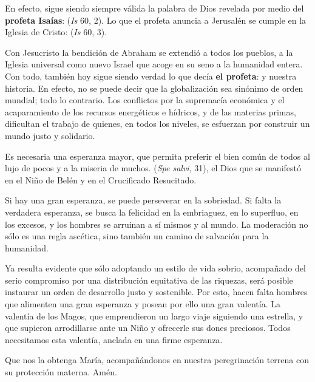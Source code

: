 {En efecto, sigue siendo siempre válida la palabra de Dios revelada por medio del \textbf{profeta Isaías}:  (\emph{Is} 60, 2). Lo que el profeta anuncia a Jerusalén se cumple en la Iglesia de Cristo:  (\emph{Is} 60, 3).

Con Jesucristo la bendición de Abraham se extendió a todos los pueblos, a la Iglesia universal como nuevo Israel que acoge en su seno a la humanidad entera. Con todo, también hoy sigue siendo verdad lo que decía \textbf{el profeta}:  y nuestra historia. En efecto, no se puede decir que la globalización sea sinónimo de orden mundial; todo lo contrario. Los conflictos por la supremacía económica y el acaparamiento de los recursos energéticos e hídricos, y de las materias primas, dificultan el trabajo de quienes, en todos los niveles, se esfuerzan por construir un mundo justo y solidario.

Es necesaria una esperanza mayor, que permita preferir el bien común de todos al lujo de pocos y a la miseria de muchos.  (\emph{Spe salvi}, 31), el Dios que se manifestó en el Niño de Belén y en el Crucificado Resucitado.

Si hay una gran esperanza, se puede perseverar en la sobriedad. Si falta la verdadera esperanza, se busca la felicidad en la embriaguez, en lo superfluo, en los excesos, y los hombres se arruinan a sí mismos y al mundo. La moderación no sólo es una regla ascética, sino también un camino de salvación para la humanidad.

Ya resulta evidente que sólo adoptando un estilo de vida sobrio, acompañado del serio compromiso por una distribución equitativa de las riquezas, será posible instaurar un orden de desarrollo justo y sostenible. Por esto, hacen falta hombres que alimenten una gran esperanza y posean por ello una gran valentía. La valentía de los Magos, que emprendieron un largo viaje siguiendo una estrella, y que supieron arrodillarse ante un Niño y ofrecerle sus dones preciosos. Todos necesitamos esta valentía, anclada en una firme esperanza.

Que nos la obtenga María, acompañándonos en nuestra peregrinación terrena con su protección materna. Amén.

}
